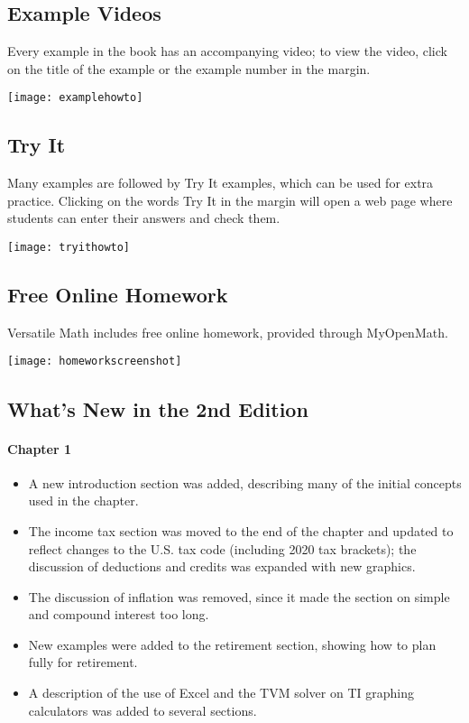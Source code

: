 \subsection{Example Videos}
\parbox{0.75\textwidth}{Every example in the book has an accompanying video; to view the video, click on the title of the example or the example number in the margin.}
\begin{center}
\texttt{[image: examplehowto]}
\end{center}

\subsection{Try It}
\parbox{0.75\textwidth}{Many examples are followed by Try It examples, which can be used for extra practice.  Clicking on the words Try It in the margin will open a web page where students can enter their answers and check them.}
\begin{center}
\texttt{[image: tryithowto]}
\end{center}

\subsection{Free Online Homework}
\parbox{0.75\textwidth}{Versatile Math includes free online homework, provided through MyOpenMath.}
\begin{center}
\texttt{[image: homeworkscreenshot]}
\end{center}
\vfill
\pagebreak

\subsection{What's New in the 2nd Edition}
\paragraph{Chapter 1}
\begin{itemize}
\item A new introduction section was added, describing many of the initial concepts used in the chapter.
\item The income tax section was moved to the end of the chapter and updated to reflect changes to the U.S. tax code (including 2020 tax brackets); the discussion of deductions and credits was expanded with new graphics.
\item The discussion of inflation was removed, since it made the section on simple and compound interest too long.
\item New examples were added to the retirement section, showing how to plan fully for retirement.
\item A description of the use of Excel and the TVM solver on TI graphing calculators was added to several sections. 
\end{itemize}

